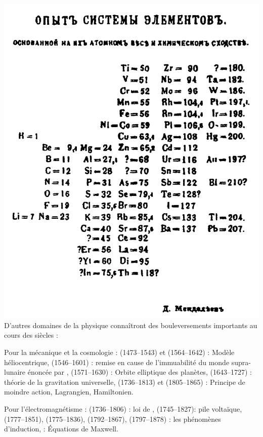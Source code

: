 \marginpar
{
	\vspace{2cm}
	\includegraphics[width=\marginparwidth]{SM/periodique.png}
    \label{periodique}
}
D'autres domaines de la physique connaîtront des bouleversements importants au cours des siècles : 

Pour la mécanique et la cosmologie :  (\num{1473}--\num{1543}) et  (\num{1564}--\num{1642}) : Modèle héliocentrique,  (\num{1546}--\num{1601}) : remise en cause de  l'immuabilité du monde supra-lunaire énoncée par ,  (\num{1571}--\num{1630}) : Orbite elliptique des planètes,  (\num{1643}--\num{1727}) : théorie de la gravitation universelle,  (\num{1736}--\num{1813}) et  (\num{1805}--\num{1865}) : Principe de moindre action, Lagrangien, Hamiltonien.

Pour l'électromagnétisme :  (\num{1736}--\num{1806}) : loi de ,  (\num{1745}--\num{1827}): pile voltaïque,  (\num{1777}--\num{1851}),  (\num{1775}--\num{1836}),  (\num{1792}--\num{1867}),  (\num{1797}--\num{1878}) : les phénomènes d'induction,  : Équations de Maxwell.

